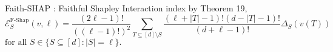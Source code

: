 \documentclass[10pt]{beamer}
\newcommand{\f}{v}
\def\Expl{\mathcal{E}}
\begin{document}
\begin{frame}{Faith-SHAP : Faithful Shapley Interaction index}
    by Theorem 19,
    \begin{equation*}
    \label{eqn:faith_shapley_highest_order}
    \Expl_S^{\text{F-Shap}}(\f,\ell) = \frac{(2\ell -1)!}{((\ell-1)!)^2}
    \sum_{T \subseteq [d] \setminus S}\frac{(\ell+|T|-1)!(d-|T|-1)!}{(d+\ell-1)!}   \Delta_S(\f(T))
    \ \ 
    \end{equation*}
    $\text{for all } S \in \{ S \subseteq [d] : |S| = \ell \}.$
\end{frame}
\begin{frame}
    
\end{frame}
\begin{frame}
    
\end{frame}
\begin{frame}
    
\end{frame}
\begin{frame}
    
\end{frame}



\end{document}
